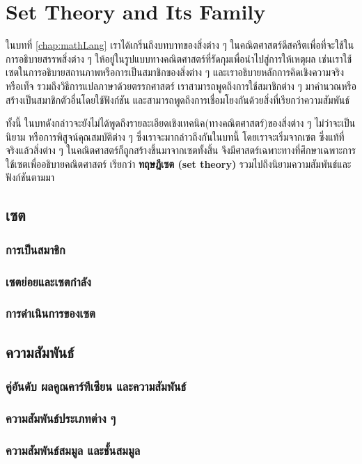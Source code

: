 \chapter{Set Theory and Its Family}

ในบทที่ \ref{chap:mathLang} เราได้เกริ่นถึงบทบาทของสิ่งต่าง ๆ ในคณิตศาสตร์ดีสครีตเพื่อที่จะใช้ในการอธิบายสรรพสิ่งต่าง ๆ ให้อยู่ในรูปแบบทางคณิตศาสตร์ที่รัดกุมเพื่อนำไปสู่การให้เหตุผล เช่นเราใช้เซตในการอธิบายสถานภาพหรือการเป็นสมาชิกของสิ่งต่าง ๆ และเราอธิบายหลักการคิดเชิงความจริงหรือเท็จ รวมถึงวิธีการแปลภาษาด้วยตรรกศาสตร์ เราสามารถพูดถึงการใช้สมาชิกต่าง ๆ มาคำนวณหรือสร้างเป็นสมาชิกตัวอื่นโดยใช้ฟังก์ชัน และสามารถพูดถึงการเชื่อมโยงกันด้วยสิ่งที่เรียกว่าความสัมพันธ์

ทั้งนี้ ในบทดังกล่าวจะยังไม่ได้พูดถึงรายละเอียดเชิงเทคนิค(ทางคณิตศาสตร์)ของสิ่งต่าง ๆ ไม่ว่าจะเป็นนิยาม หรือการพิสูจน์คุณสมบัติต่าง ๆ ซึ่งเราจะมากล่าวถึงกันในบทนี้ โดยเราจะเริ่มจากเซต ซึ่งแท้ที่จริงแล้วสิ่งต่าง ๆ ในคณิตศาสตร์ก็ถูกสร้างขึ้นมาจากเซตทั้งสิ้น จึงมีศาสตร์เฉพาะทางที่ศึกษาเฉพาะการใช้เซตเพื่ออธิบายคณิตศาสตร์ เรียกว่า \textbf{ทฤษฎีเซต (set theory)} รวมไปถึงนิยามความสัมพันธ์และฟังก์ชันตามมา

\section{เซต}
\subsection{การเป็นสมาชิก}
\subsection{เซตย่อยและเซตกำลัง}
\subsection{การดำเนินการของเซต}

\section{ความสัมพันธ์}
\subsection{คู่อันดับ ผลคูณคาร์ทีเซียน และความสัมพันธ์}
\subsection{ความสัมพันธ์ประเภทต่าง ๆ}
\subsection{ความสัมพันธ์สมมูล และชั้นสมมูล}

